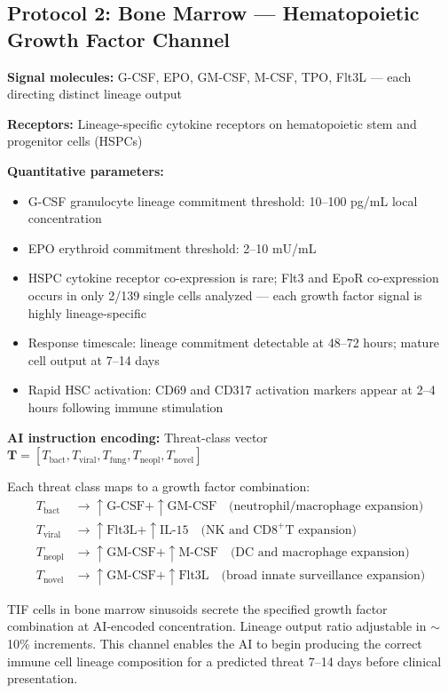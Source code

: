 \documentclass[12pt]{article}
\begin{document}
\subsection{Protocol 2: Bone Marrow --- Hematopoietic Growth Factor Channel}

\textbf{Signal molecules:} G-CSF, EPO, GM-CSF, M-CSF, TPO, Flt3L --- each directing distinct lineage output

\textbf{Receptors:} Lineage-specific cytokine receptors on hematopoietic stem and progenitor cells (HSPCs)

\textbf{Quantitative parameters:}
\begin{itemize}
    \item G-CSF granulocyte lineage commitment threshold: 10--100 pg/mL local concentration
    \item EPO erythroid commitment threshold: 2--10 mU/mL
    \item HSPC cytokine receptor co-expression is rare; Flt3 and EpoR co-expression occurs in only 2/139 single cells analyzed \cite{hsc_biology_2021} --- each growth factor signal is highly lineage-specific
    \item Response timescale: lineage commitment detectable at 48--72 hours; mature cell output at 7--14 days
    \item Rapid HSC activation: CD69 and CD317 activation markers appear at 2--4 hours following immune stimulation \cite{hsc_activation_2022}
\end{itemize}

\textbf{AI instruction encoding:}
Threat-class vector $\mathbf{T} = [T_{\text{bact}}, T_{\text{viral}}, T_{\text{fung}}, T_{\text{neopl}}, T_{\text{novel}}]$

Each threat class maps to a growth factor combination:
\begin{align}
T_{\text{bact}} &\to \uparrow\text{G-CSF} + \uparrow\text{GM-CSF} \quad \text{(neutrophil/macrophage expansion)} \\
T_{\text{viral}} &\to \uparrow\text{Flt3L} + \uparrow\text{IL-15} \quad \text{(NK and CD8}^+\text{T expansion)} \\
T_{\text{neopl}} &\to \uparrow\text{GM-CSF} + \uparrow\text{M-CSF} \quad \text{(DC and macrophage expansion)} \\
T_{\text{novel}} &\to \uparrow\text{GM-CSF} + \uparrow\text{Flt3L} \quad \text{(broad innate surveillance expansion)}
\end{align}

TIF cells in bone marrow sinusoids secrete the specified growth factor combination at AI-encoded concentration. Lineage output ratio adjustable in $\sim$10\% increments. This channel enables the AI to begin producing the correct immune cell lineage composition for a predicted threat 7--14 days before clinical presentation.
\end{document}
